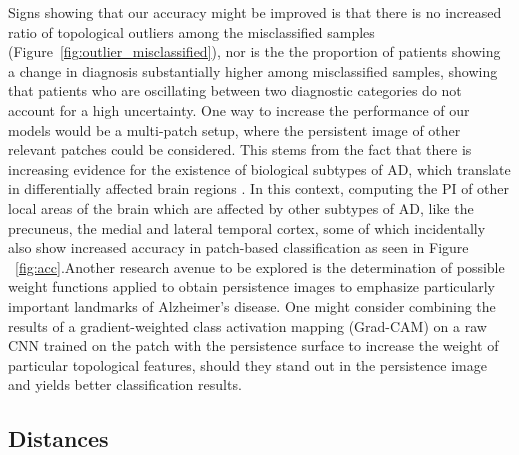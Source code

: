 \documentclass{article}
\begin{document}
Signs showing that our accuracy might be improved is that there is no increased ratio of topological
outliers among the misclassified samples (Figure~\ref{fig:outlier_misclassified}), nor is the
the proportion of patients showing a change in diagnosis substantially higher among misclassified
samples, showing that patients who are oscillating between two diagnostic categories do not account
for a high uncertainty. One way to increase the performance of our models would be a multi-patch
setup, where the persistent image of other relevant patches could be considered. This stems from the
fact that there is increasing evidence for the existence of biological subtypes of AD, which
translate in differentially affected brain regions \citep{poulakis2018heterogeneous,
tijms2020pathophysiological}. In this context, computing the PI of other local areas of the brain
which are affected by other subtypes of AD, like the precuneus, the medial and lateral temporal
cortex, some of which incidentally also show increased accuracy in patch-based classification as
seen in Figure ~\ref{fig:acc}.Another research avenue to be explored is the determination of
possible weight functions applied to obtain persistence images to emphasize particularly important
landmarks of Alzheimer's disease. One might consider combining the results of a gradient-weighted
class activation mapping (Grad-CAM) on a raw CNN trained on the patch with the persistence surface
to increase the weight of particular topological features, should they stand out in the persistence
image and yields better classification results.


\subsection{Distances}\label{sec:disc-dist}

\end{document}
